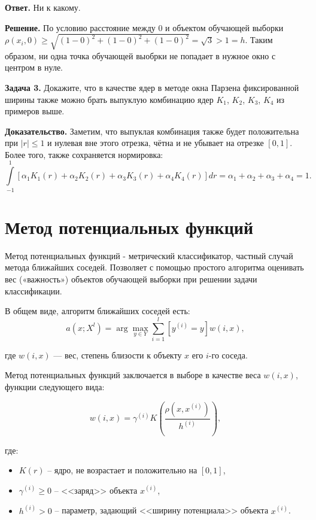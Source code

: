 \textbf{Ответ.} Ни к какому.

\textbf{Решение.} По условию расстояние между $0$ и объектом обучающей выборки $\rho(x_i,0)\ge\sqrt{(1-0)^2+(1-0)^2+(1-0)^2} = \sqrt{3} > 1 = h$. Таким образом, ни одна точка обучающей выобрки не попадает в нужное окно с центром в нуле.

\textbf{Задача 3.} Докажите, что в качестве ядер в методе окна Парзена фиксированной ширины также можно брать выпуклую комбинацию ядер $K_1$, $K_2$, $K_3$, $K_4$ из примеров выше.

\textbf{Доказательство.} Заметим, что выпуклая комбинация также будет положительна при $|r|\le 1$ и нулевая вне этого отрезка, чётна и не убывает на отрезке $[0,1]$. Более того, также сохраняется нормировка: 
\begin{equation*}
	\displaystyle\int\limits_{-1}^{1}\left[\alpha_1K_1(r)+\alpha_2K_2(r) +\alpha_3K_3(r)+\alpha_4K_4(r)\right]dr = \alpha_1 + \alpha_2 +\alpha_3 +\alpha_4 =1.
\end{equation*}

\section{Метод потенциальных функций}

Метод потенциальных функций - метрический классификатор, частный случай метода ближайших соседей. Позволяет с помощью простого алгоритма оценивать вес («важность») объектов обучающей выборки при решении задачи классификации.

В общем виде, алгоритм ближайших соседей есть:
\begin{equation*}
	\displaystyle a(x; X^l) = \arg\max_{y\in Y} \sum\limits_{i=1}^l[y^{(i)}=y]w(i,x), 
\end{equation*}

где $w(i,x)$ — вес, степень близости к объекту $x$ его $i$-го соседа.

Метод потенциальных функций заключается в выборе в качестве веса $w(i,x)$, функции следующего вида:

\begin{equation*}
	\displaystyle w(i,x) = \gamma^{(i)} K\left(\frac{\rho(x, x^{(i)})}{h^{(i)}}\right),
\end{equation*}

где:

\begin{itemize}
	\item $K(r)$ -- ядро, не возрастает и положительно на $[0, 1]$,
	\item $\gamma^{(i)} \ge 0$ -- <<заряд>> объекта $x^{(i)}$, 
	\item $h^{(i)} > 0$ -- параметр, задающий <<ширину потенциала>> объекта $x^{(i)}$. 
\end{itemize}

